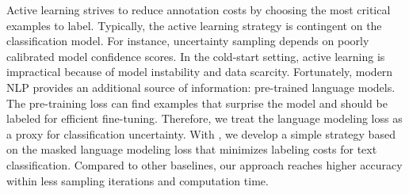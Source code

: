 Active learning strives to reduce
annotation costs by choosing the most critical examples to label.
Typically, the active learning strategy is contingent on the
classification model.  For instance, uncertainty sampling depends on poorly
calibrated
model confidence
scores.
In the cold-start setting, active learning is impractical
because of model instability and data scarcity.
Fortunately, modern NLP provides an additional source of information:
pre-trained language models.
The pre-training loss can find examples that surprise the model and should be
labeled for efficient fine-tuning.
Therefore, we treat the language modeling loss as a proxy for classification
uncertainty.
 With \bert, we develop a simple strategy based on
 the masked language modeling loss that minimizes labeling costs for text
 classification.
Compared to other baselines, our approach reaches higher accuracy within less sampling
iterations and computation time.

